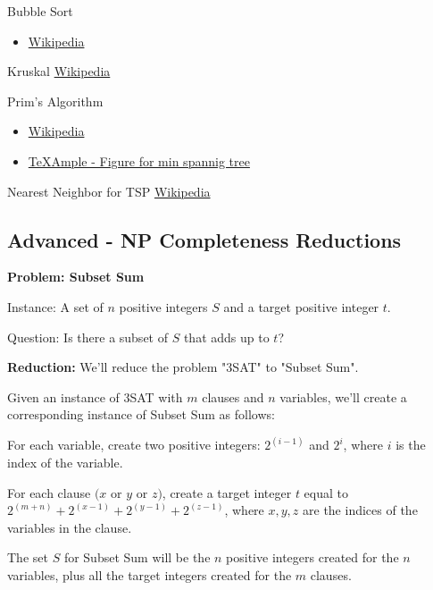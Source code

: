 \begin{resource}
Bubble Sort
\begin{itemize}
\item \href{https://en.wikipedia.org/wiki/Bubble_sort}{Wikipedia}
\end{itemize}
\end{resource}
\begin{resource}
Kruskal
\href{https://en.wikipedia.org/wiki/Kruskal\%27s_algorithm}{Wikipedia}
\end{resource}
\begin{resource}
Prim's Algorithm
\begin{itemize}
\item \href{https://en.wikipedia.org/wiki/Prim\%27s_algorithm}{Wikipedia}
\item \href{http://www.texample.net/tikz/examples/prims-algorithm/}{TeXAmple - Figure for min spannig tree}
\end{itemize}
\end{resource}
\begin{resource}
Nearest Neighbor for TSP
\href{https://en.wikipedia.org/wiki/Nearest_neighbour_algorithm}{Wikipedia}
\end{resource}

\subsection{Advanced - NP Completeness Reductions}
\textbf{Problem: Subset Sum}

Instance: A set of $n$ positive integers $S$ and a target positive integer $t$.

Question: Is there a subset of $S$ that adds up to $t$?

\textbf{Reduction:} We'll reduce the problem "3SAT" to "Subset Sum".

Given an instance of 3SAT with $m$ clauses and $n$ variables, we'll create a corresponding instance of Subset Sum as follows:

For each variable, create two positive integers: $2^{(i-1)}$ and $2^{i}$, where $i$ is the index of the variable.

For each clause $(x$ or $y$ or $z)$, create a target integer $t$ equal to $2^{(m+n)} + 2^{(x-1)} + 2^{(y-1)} + 2^{(z-1)}$, where $x, y, z$ are the indices of the variables in the clause.

The set $S$ for Subset Sum will be the $n$ positive integers created for the $n$ variables, plus all the target integers created for the $m$ clauses.

